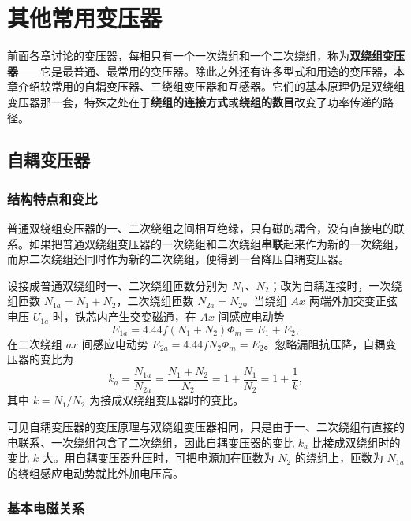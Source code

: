 \chapter{其他常用变压器}

前面各章讨论的变压器，每相只有一个一次绕组和一个二次绕组，称为\textbf{双绕组变压器}——它是最普通、最常用的变压器。除此之外还有许多型式和用途的变压器，本章介绍较常用的自耦变压器、三绕组变压器和互感器。它们的基本原理仍是双绕组变压器那一套，特殊之处在于\textbf{绕组的连接方式}或\textbf{绕组的数目}改变了功率传递的路径。

\section{自耦变压器}

\subsection{结构特点和变比}
普通双绕组变压器的一、二次绕组之间相互绝缘，只有磁的耦合，没有直接电的联系。如果把普通双绕组变压器的一次绕组和二次绕组\textbf{串联}起来作为新的一次绕组，而原二次绕组还同时作为新的二次绕组，便得到一台降压自耦变压器。

设接成普通双绕组时一、二次绕组匝数分别为 $N_1$、$N_2$；改为自耦连接时，一次绕组匝数 $N_{1a}=N_1+N_2$，二次绕组匝数 $N_{2a}=N_2$。当绕组 $Ax$ 两端外加交变正弦电压 $U_{1a}$ 时，铁芯内产生交变磁通，在 $Ax$ 间感应电动势
\begin{equation}
E_{1a}=4.44f\left(N_1+N_2\right)\Phi_m=E_1+E_2 ,
\end{equation}
在二次绕组 $ax$ 间感应电动势 $E_{2a}=4.44fN_2\Phi_m=E_2$。忽略漏阻抗压降，自耦变压器的变比为
\begin{equation}
k_a=\frac{N_{1a}}{N_{2a}}=\frac{N_1+N_2}{N_2}=1+\frac{N_1}{N_2}=1+\frac{1}{k},
\end{equation}
其中 $k=N_1/N_2$ 为接成双绕组变压器时的变比。

可见自耦变压器的变压原理与双绕组变压器相同，只是由于一、二次绕组有直接的电联系、一次绕组包含了二次绕组，因此自耦变压器的变比 $k_a$ 比接成双绕组时的变比 $k$ 大。用自耦变压器升压时，可把电源加在匝数为 $N_2$ 的绕组上，匝数为 $N_{1a}$ 的绕组感应电动势就比外加电压高。

\subsection{基本电磁关系}
